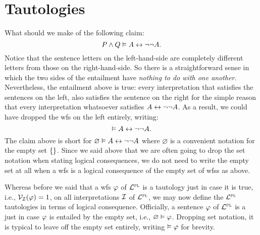 %
%
%
%




\section{Tautologies}


What should we make of the following claim:
  $$P\wedge Q \vDash A\leftrightarrow\neg\neg A.$$
Notice that the sentence letters on the left-hand-side are completely different letters from those on the right-hand-side.
So there is a straightforward sense in which the two sides of the entailment have \emph{nothing to do with one another}.
Nevertheless, the entailment above is true: every interpretation that satisfies the sentences on the left, also satisfies the sentence on the right for the simple reason that every interpretation whatsoever satisfies $A\leftrightarrow\neg\neg A$.
As a result, we could have dropped the wfs on the left entirely, writing:
  $$\vDash A\leftrightarrow\neg\neg A.$$
The claim above is short for $\varnothing\vDash A\leftrightarrow\neg\neg A$ where $\varnothing$ is a convenient notation for the empty set $\lbrace\rbrace$.
Since we said above that we are often going to drop the set notation when stating logical consequences, we do not need to write the empty set at all when a wfs is a logical consequence of the empty set of wfss as above.

Whereas before we said that a wfs $\varphi$ of $\mathcal{L}^{\textsc{pl}}$ is a tautology just in case it is true, i.e., $\mathcal{V}_{\mathcal{I}}(\varphi) = 1$, on all interpretations $\mathcal{I}$ of $\mathcal{L}^{\textsc{pl}}$, we may now define the $\mathcal{L}^{\textsc{pl}}$ tautologies in terms of logical consequence.
Officially, a sentence $\varphi$ of $\mathcal{L}^{\textsc{pl}}$ is a  just in case $\varphi$ is entailed by the empty set, i.e., $\varnothing \vDash \varphi$.
Dropping set notation, it is typical to leave off the empty set entirely, writing $\vDash \varphi$ for brevity.

